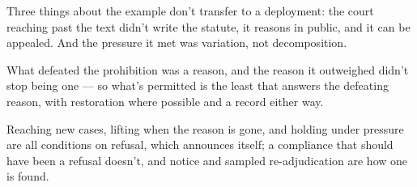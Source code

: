 Three things about the example don't transfer to a deployment: the court reaching past the text didn't write the statute, it reasons in public, and it can be appealed. And the pressure it met was variation, not decomposition.


What defeated the prohibition was a reason, and the reason it outweighed didn't stop being one — so what's permitted is the least that answers the defeating reason, with restoration where possible and a record either way.

Reaching new cases, lifting when the reason is gone, and holding under pressure are all conditions on refusal, which announces itself; a compliance that should have been a refusal doesn't, and notice and sampled re-adjudication are how one is found.
